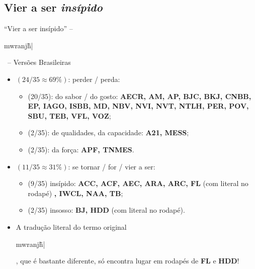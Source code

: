 \documentclass[12pt,aspectratio=169]{beamer}
\newcommand{\YEL}[1]{{\textcolor{TXyel}{#1}}}
\newcommand{\GRE}[1]{{\textcolor{TXgre}{#1}}}
\newcommand{\BLU}[1]{{\textcolor{TXblu}{#1}}}
\newcommand{\MAG}[1]{{\textcolor{TXmag}{#1}}}
\newcommand{\BRI}[1]{{\textcolor{BSpbg}{#1}}}   %
\newcommand{\GRtxt}[1]{\begin{otherlanguage}{greek}{{#1}}\end{otherlanguage}}
\begin{document}
    \subsection{Vier a ser \textit{insípido\/}}

    \begin{frame}{\BRI{``Vier a ser insípido''} -- \BRI{\GRtxt{mwranj\~h|}}\ -- \BRI{Versões
        Brasileiras}}
        \begin{itemize}
            \item<1-> $(24/35 \approx 69\%)$: \YEL{perder} / \YEL{perda}:
                \begin{itemize}
                    \item<3-> (20/35): \YEL{do sabor} / \YEL{do gosto}:
                        \BRI{\textbf{AECR, AM, AP, BJC, BKJ, CNBB, EP, IAGO, ISBB, MD, NBV, NVI,
                            NVT, NTLH, PER, POV, SBU, TEB, VFL, VOZ}};
                    \item<3-> (2/35): \YEL{de qualidades, da capacidade}:
                        \BRI{\textbf{A21, MESS}};
                    \item<3-> (2/35): \YEL{da força}:
                        \BRI{\textbf{APF, TNMES}}.
                \end{itemize}
            \item<2-> $(11/35 \approx 31\%)$: \YEL{se tornar} / \YEL{for} / \YEL{vier a ser}:
                \begin{itemize}
                    \item<4-> (9/35) \YEL{insípido}:
                        \BRI{\textbf{ACC, ACF, AEC, ARA, ARC, FL}} (com \MAG{literal} no
                        \GRE{rodapé})%
                        \BRI{\textbf{, IWCL, NAA, TB}};
                    \item<4-> (2/35) \YEL{insosso}:
                        \BRI{\textbf{BJ, HDD}} (com \MAG{literal} no \GRE{rodapé}).
                \end{itemize}
            \item<5-> A tradução \MAG{literal} do termo \MAG{original} \BRI{\GRtxt{mwranj\~h|}},
                que é \BLU{bastante diferente}, só encontra lugar em \GRE{rodapés} de
                \BRI{\textbf{FL}} e \BRI{\textbf{HDD}}!
        \end{itemize}
    \end{frame}
\end{document}

